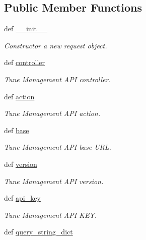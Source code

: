 \subsection*{Public Member Functions}
\begin{DoxyCompactItemize}
\item 
def \hyperlink{classtune_1_1management_1_1service_1_1request_1_1Request_a00c4b46fd520819e920dcbf055ebd56f}{\-\_\-\-\_\-init\-\_\-\-\_\-}
\begin{DoxyCompactList}\small\item\em Constructor a new request object. \end{DoxyCompactList}\item 
def \hyperlink{classtune_1_1management_1_1service_1_1request_1_1Request_ad562e043475077f74e85e62a542df183}{controller}
\begin{DoxyCompactList}\small\item\em Tune Management A\-P\-I controller. \end{DoxyCompactList}\item 
def \hyperlink{classtune_1_1management_1_1service_1_1request_1_1Request_a0e2dc4328008db734e2bdf18731228ea}{action}
\begin{DoxyCompactList}\small\item\em Tune Management A\-P\-I action. \end{DoxyCompactList}\item 
def \hyperlink{classtune_1_1management_1_1service_1_1request_1_1Request_abfd476a6b9ea9b82a69e123efc9f5246}{base}
\begin{DoxyCompactList}\small\item\em Tune Management A\-P\-I base U\-R\-L. \end{DoxyCompactList}\item 
def \hyperlink{classtune_1_1management_1_1service_1_1request_1_1Request_a9b7a30d116b32072ba5c508037c8db6d}{version}
\begin{DoxyCompactList}\small\item\em Tune Management A\-P\-I version. \end{DoxyCompactList}\item 
def \hyperlink{classtune_1_1management_1_1service_1_1request_1_1Request_aa667f438b5b15c4fd635e95381c06757}{api\-\_\-key}
\begin{DoxyCompactList}\small\item\em Tune Management A\-P\-I K\-E\-Y. \end{DoxyCompactList}\item 
def \hyperlink{classtune_1_1management_1_1service_1_1request_1_1Request_ad688dcf65800127503968818b61af56e}{query\-\_\-string\-\_\-dict}

\end{DoxyCompactItemize}
